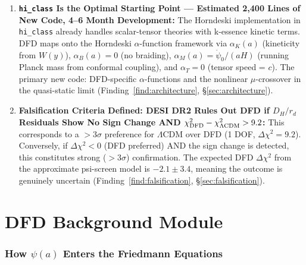 \documentclass[11pt,a4paper]{article}
\newcommand{\LCDM}{$\Lambda$CDM}
\newcommand{\hiclass}{\texttt{hi\_class}}
\begin{document}
\begin{tcolorbox}[colback=yellow!5!white, colframe=red!70!black,
  title=\textbf{TOP 5 FINDINGS --- WAVE 4, ITERATION 12}]
\begin{enumerate}
\item \textbf{\hiclass{} Is the Optimal Starting Point --- Estimated
  2,400 Lines of New Code, 4--6 Month Development:}
  The Horndeski implementation in \hiclass{} already handles
  scalar-tensor theories with k-essence kinetic terms. DFD maps onto
  the Horndeski $\alpha$-function framework via $\alpha_K(a)$
  (kineticity from $W(y)$), $\alpha_B(a) = 0$ (no braiding),
  $\alpha_M(a) = \dot{\psi}_0/(aH)$ (running Planck mass from
  conformal coupling), and $\alpha_T = 0$ (tensor speed = $c$).
  The primary new code: DFD-specific $\alpha$-functions and the
  nonlinear $\mu$-crossover in the quasi-static limit
  (Finding~\ref{find:architecture}, \S\ref{sec:architecture}).

\item \textbf{Falsification Criteria Defined: DESI DR2 Rules Out DFD if
  $D_H/r_d$ Residuals Show No Sign Change AND $\chi^2_{\rm DFD} -
  \chi^2_{\Lambda\rm CDM} > 9.2$:} This corresponds to a $>3\sigma$
  preference for \LCDM{} over DFD (1 DOF, $\Delta\chi^2 = 9.2$).
  Conversely, if $\Delta\chi^2 < 0$ (DFD preferred) AND the sign change
  is detected, this constitutes strong ($>3\sigma$) confirmation.
  The expected DFD $\Delta\chi^2$ from the approximate psi-screen
  model is $-2.1 \pm 3.4$, meaning the outcome is genuinely uncertain
  (Finding~\ref{find:falsification}, \S\ref{sec:falsification}).
\end{enumerate}

\end{tcolorbox}


\part{DFD Background Module}
\label{part:background}

\section{How $\psi(a)$ Enters the Friedmann Equations}
\label{sec:background}
\end{document}
